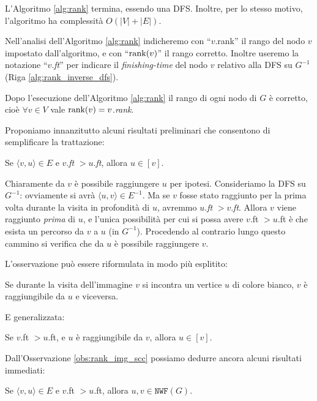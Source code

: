 \begin{observation}
    L'Algoritmo \ref{alg:rank} termina, essendo una DFS. Inoltre, per lo stesso motivo, l'algoritmo ha complessità $O(|V| + |E|)$.
\end{observation}
Nell'analisi dell'Algoritmo \ref{alg:rank} indicheremo con ``$v$.rank'' il rango del nodo $v$ impostato dall'algoritmo, e con ``$\textup{rank}(v)$'' il rango corretto. Inoltre useremo la notazione ``$v$.\emph{ft}'' per indicare il \emph{finishing-time} del nodo $v$ relativo alla DFS su $G^{-1}$ (Riga \ref{alg:rank_inverse_dfs}).
\begin{theorem}
    \label{theo:rank_correct}
    Dopo l'esecuzione dell'Algoritmo \ref{alg:rank} il rango di ogni nodo di $G$ è corretto, cioè $\forall v \in V$ vale $\textup{rank}(v) = v$.\emph{rank}.
\end{theorem}

Proponiamo innanzitutto alcuni risultati preliminari che consentono di semplificare la trattazione:
\begin{observation}
    \label{obs:rank_img_scc}
    Se $\langle v,u\rangle \in E$ e $v$.\emph{ft} $> u$.\emph{ft}, allora $u \in [v]$.
\end{observation}
\begin{proof2}
    Chiaramente da $v$ è possibile raggiungere $u$ per ipotesi. Consideriamo la DFS su $G^{-1}$: ovviamente si avrà $\langle u, v\rangle \in E^{-1}$. Ma se $v$ fosse stato raggiunto per la prima volta durante la visita in profondità di $u$, avremmo $u$.\emph{ft} $> v$.\emph{ft}. Allora $v$ viene raggiunto \emph{prima} di $u$, e l'unica possibilità per cui si possa avere $v$.ft $> u$.ft è che esista un percorso da $v$ a $u$ (in $G^{-1}$). Procedendo al contrario lungo questo cammino si verifica che da $u$ è possibile raggiungere $v$.
\end{proof2}

L'osservazione può essere riformulata in modo più esplitito:
\begin{corollary}
    Se durante la visita dell'immagine $v$ si incontra un vertice $u$ di colore bianco, $v$ è raggiungibile da $u$ e viceversa.
\end{corollary}

E generalizzata:
\begin{corollary}
    \label{cor:scc_minore_inglobamento}
    Se $v$.ft $> u$.ft, e $u$ è raggiungibile da $v$, allora $u \in [v]$.
\end{corollary}

Dall'Osservazione \ref{obs:rank_img_scc} possiamo dedurre ancora alcuni risultati immediati:
\begin{corollary}
    Se $\langle v,u\rangle \in E$ e $v$.ft $> u$.ft, allora $u,v \in \texttt{NWF}(G)$.
\end{corollary}

